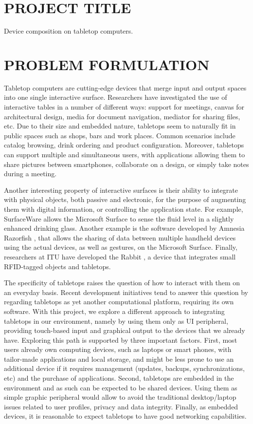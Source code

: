 \section{PROJECT TITLE}

Device composition on tabletop computers.

\section{PROBLEM FORMULATION}

Tabletop computers are cutting-edge devices that merge input and output spaces into one single interactive surface.
Researchers have investigated the use of interactive tables in a number of different ways: support for meetings, canvas for architectural design, media for document navigation, mediator for sharing files, etc.
Due to their size and embedded nature, tabletops seem to naturally fit in public spaces such as shops, bars and work places.
Common scenarios include catalog browsing, drink ordering and product configuration.
Moreover, tabletops can support multiple and simultaneous users, with applications allowing them to share pictures between smartphones, collaborate on a design, or simply take notes during a meeting.

Another interesting property of interactive surfaces is their ability to integrate with physical objects, both passive and electronic, for the purpose of augmenting them with digital information, or controlling the application state.
For example, SurfaceWare \cite{surfaceware} allows the Microsoft Surface to sense the fluid level in a slightly enhanced drinking glass.
Another example is the software developed by Amnesia Razorfish \cite{amnesia}, that allows the sharing of data between multiple handheld devices using the actual devices, as well as gestures, on the Microsoft Surface.
Finally, researchers at ITU have developed the Rabbit \cite{rabbit}, a device that integrates small RFID-tagged objects and tabletops.

The specificity of tabletops raises the question of how to interact with them on an everyday basis.
Recent development initiatives tend to answer this question by regarding tabletops as yet another computational platform, requiring its own software.
With this project, we explore a different approach to integrating tabletops in our environment, namely by using them only as UI peripheral, providing touch-based input and graphical output to the devices that we already have.
Exploring this path is supported by three important factors.
First, most users already own computing devices, such as laptops or smart phones, with tailor-made applications and local storage, and might be less prone to use an additional device if it requires management (updates, backups, synchronizations, etc) and the purchase of applications.
Second, tabletops are embedded in the environment and as such can be expected to be shared devices.
Using them as simple graphic peripheral would allow to avoid the traditional desktop/laptop issues related to user profiles, privacy and data integrity.
Finally, as embedded devices, it is reasonable to expect tabletops to have good networking capabilities.

